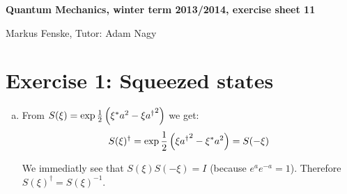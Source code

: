 \documentclass[a4paper,german,12pt,smallheadings]{scrartcl}
\begin{document}
\allowdisplaybreaks %
\begin{center}
\bfseries %
\sffamily %
\vspace{-40pt}
Quantum Mechanics, winter term 2013/2014, exercise sheet 11

Markus Fenske, Tutor: Adam Nagy
\vspace{-10pt}
\end{center}

\section*{Exercise 1: Squeezed states}
\begin{enumerate}[a)]
  \item
    From $S(\xi) = \exp \frac{1}{2} \del{\xi^* a^2 - \xi {a^\dagger}^2}$ we get:
    \begin{align*}
      S(\xi)^\dagger = \exp \frac{1}{2} \del{\xi {a^\dagger}^2 - \xi^* a^2} = S(-\xi)
    \end{align*}

    We immediatly see that $S(\xi)S(-\xi) = I$ (because $e^a e^{-a} = 1$).
    Therefore $S(\xi)^\dagger = S(\xi)^{-1}$.
\end{enumerate}
\end{document}
